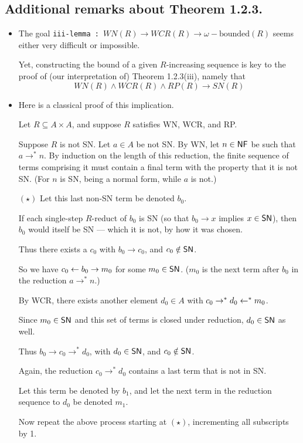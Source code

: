 \documentclass{scrartcl}
\begin{document}
\subsection*{Additional remarks about Theorem 1.2.3.}
\begin{itemize}
  
  \item The goal \texttt{iii-lemma :  $WN(R) \to WCR(R) \to \omega{-}\text{bounded}(R)$}
  seems either very difficult or impossible.

  Yet, constructing the bound of a given $R$-increasing sequence is key to the proof of
  (our interpretation of) Theorem 1.2.3(iii), namely that
  \[ WN(R) \land WCR(R) \land RP(R) \to SN(R) \tag{iii} \]
  \item Here is a classical proof of this implication.

  Let $R \subseteq A \times A$, and suppose $R$ satisfies WN, WCR, and RP.

  Suppose $R$ is not SN.  Let $a \in A$ be not SN.  By WN, let $n \in \mathsf{NF}$ be
  such that $a \to^* n$.  By induction on the length of this reduction, the finite sequence
  of terms comprising it must contain a final term with the property that
  it is not SN.  (For $n$ is SN, being a normal form, while $a$ is not.)

  $(\star)$ Let this last non-SN term be denoted $b_0$.

  If each single-step $R$-reduct of $b_0$ is SN (so that $b_0 \to x$ implies $x\in \mathsf{SN}$),
  then $b_0$ would itself be SN --- which it is not, by how it was chosen.

  Thus there exists a $c_0$ with $b_0 \to c_0$, and $c_0 \notin \mathsf{SN}$.

  So we have $c_0 \leftarrow b_0 \to m_0$ for some $m_0 \in \mathsf{SN}$. ($m_0$ is the next term after $b_0$ in the reduction $a \to^* n$.)

  By WCR, there exists another element $d_0 \in A$ with $c_0 \to^* d_0 \leftarrow^* m_0$.

  Since $m_0 \in \mathsf{SN}$ and this set of terms is closed under reduction, $d_0 \in \mathsf{SN}$ as well.

  Thus $b_0 \to c_0 \to^* d_0$, with $d_0 \in \mathsf{SN}$, and $c_0 \notin \mathsf{SN}$.

  Again, the reduction $c_0 \to^* d_0$ contains a last term that is not in SN.

  Let this term be denoted by $b_1$, and let the next term in the reduction sequence
  to $d_0$ be denoted $m_1$.

  Now repeat the above process starting at $(\star)$, incrementing all subscripts by 1.


\end{itemize}
\end{document}
